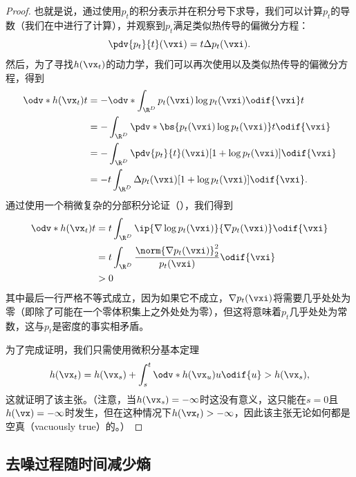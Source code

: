 \documentclass[../../book-main_zh.tex]{subfiles}
\begin{document}
\begin{proof}
    也就是说，通过使用\(p_{t}\)的积分表示并在积分号下求导，我们可以计算\(p_{t}\)的导数（我们在中进行了计算），并观察到\(p_{t}\)满足类似热传导的偏微分方程：
    \begin{equation}
        \pdv{p_{t}}{t}(\vxi) = t\Delta p_{t}(\vxi).
    \end{equation}
    然后，为了寻找\(h(\vx_{t})\)的动力学，我们可以再次使用以及类似热传导的偏微分方程，得到
    \begin{align}
        \odv*{h(\vx_{t})}{t}
        &= -\odv*{\int_{\R^{D}}p_{t}(\vxi)\log p_{t}(\vxi)\odif{\vxi}}{t} \\
        &= -\int_{\R^{D}}\pdv*{\bs{p_{t}(\vxi)\log
        p_{t}(\vxi)}}{t}\odif{\vxi} \\
        &= -\int_{\R^{D}}\pdv{p_{t}}{t}(\vxi)[1 + \log
        p_{t}(\vxi)]\odif{\vxi} \\
        &= -t\int_{\R^{D}}\Delta p_{t}(\vxi)[1 + \log p_{t}(\vxi)]\odif{\vxi}.
    \end{align}
    通过使用一个稍微复杂的分部积分论证（），我们得到
    \begin{align}
        \odv*{h(\vx_{t})}{t}
        &= t\int_{\R^{D}}\ip{\nabla \log p_{t}(\vxi)}{\nabla
        p_{t}(\vxi)}\odif{\vxi} \\
        &= t\int_{\R^{D}}\frac{\norm{\nabla
        p_{t}(\vxi)}_{2}^{2}}{p_{t}(\vxi)}\odif{\vxi} \\
        &> 0
    \end{align}
    其中最后一行严格不等式成立，因为如果它不成立，\(\nabla p_{t}(\vxi)\)将需要几乎处处为零（即除了可能在一个零体积集上之外处处为零），但这将意味着\(p_{t}\)几乎处处为常数，这与\(p_{t}\)是密度的事实相矛盾。

    为了完成证明，我们只需使用微积分基本定理
    \begin{equation}
        h(\vx_{t}) = h(\vx_{s}) +
        \int_{s}^{t}\odv*{h(\vx_{u})}{u}\odif{u} > h(\vx_{s}),
    \end{equation}
    这就证明了该主张。（注意，当\(h(\vx_{s}) = -\infty\)时这没有意义，这只能在\(s = 0\)且\(h(\vx) = -\infty\)时发生，但在这种情况下\(h(\vx_{t}) > -\infty\)，因此该主张无论如何都是空真（vacuously true）的。）
\end{proof}

\subsection{去噪过程随时间减少熵}\label{sub:denoising_entropy_decreases}
\end{document}
